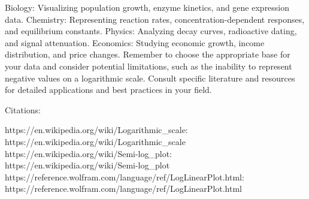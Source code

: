 \documentclass{article}
\begin{document}
Biology: Visualizing population growth, enzyme kinetics, and gene expression data.
Chemistry: Representing reaction rates, concentration-dependent responses, and equilibrium constants.
Physics: Analyzing decay curves, radioactive dating, and signal attenuation.
Economics: Studying economic growth, income distribution, and price changes.
Remember to choose the appropriate base for your data and consider potential limitations, such as the inability to represent negative values on a logarithmic scale. Consult specific literature and resources for detailed applications and best practices in your field.

Citations:

https://en.wikipedia.org/wiki/Logarithmic_scale: https://en.wikipedia.org/wiki/Logarithmic_scale
https://en.wikipedia.org/wiki/Semi-log_plot: https://en.wikipedia.org/wiki/Semi-log_plot
https://reference.wolfram.com/language/ref/LogLinearPlot.html: https://reference.wolfram.com/language/ref/LogLinearPlot.html




\end{document}

